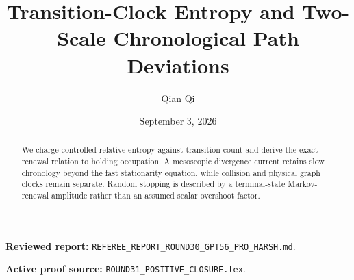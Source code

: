 \documentclass[11pt,reqno]{amsart}
\title[A3 Round 31 revision]{Transition-Clock Entropy and Two-Scale Chronological Path Deviations}
\author{Qian Qi}
\date{September 3, 2026}
\begin{document}
\begin{abstract}
We charge controlled relative entropy against transition count and derive the exact renewal relation to holding occupation.  A mesoscopic divergence current retains slow chronology beyond the fast stationarity equation, while collision and physical graph clocks remain separate.  Random stopping is described by a terminal-state Markov-renewal amplitude rather than an assumed scalar overshoot factor.
\end{abstract}
\maketitle
\noindent\textbf{Reviewed report:} \texttt{REFEREE\_REPORT\_ROUND30\_GPT56\_PRO\_HARSH.md}.\par
\noindent\textbf{Active proof source:} \texttt{ROUND31\_POSITIVE\_CLOSURE.tex}.\par

\end{document}
